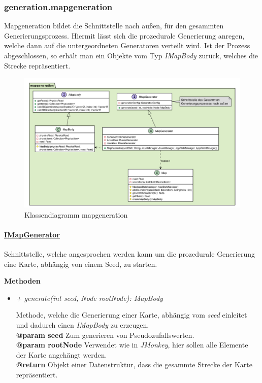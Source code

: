 \subsubsection{generation.mapgeneration}
    Mapgeneration bildet die Schnittstelle nach außen, für den gesammten Generierungsprozess. Hiermit lässt sich 
    die prozedurale Generierung anregen, welche dann auf die untergeordneten Generatoren verteilt wird. Ist der 
    Prozess abgeschlossen, so erhält man ein Objekte vom Typ \textit{IMapBody} zurück, welches die Strecke repräsentiert.

    \begin{figure}[htbp]
        \centering
        \includegraphics[width=\linewidth]{./Generierung/Bilder/mapgeneration.png}
        \caption{Klassendiagramm mapgeneration}
    \end{figure}


    \paragraph{\underline{IMapGenerator}} \mbox{}\par
            Schnittstelle, welche angesprochen werden kann um die prozedurale Generierung eine Karte, abhängig von 
            einem Seed, zu starten.\par
            
            \textbf{Methoden}					
            \begin{itemize}
                \item  \textit{+ generate(int seed, Node rootNode): MapBody}
                    \begin{leftbar}[0.9\linewidth]
                        Methode, welche die Generierung einer Karte, abhängig vom \textit{seed} einleitet
                         und dadurch einen \textit{IMapBody} zu erzeugen.\\
                        \textbf{@param seed} Zum generieren von Pseudozufallswerten.\\
                        \textbf{@param rootNode} Verwendet wie in \textit{JMonkey}, hier sollen alle Elemente der Karte 
                        angehängt werden.\\
                        \textbf{@return} Objekt einer Datenstruktur, dass die gesammte Strecke der Karte repräsentiert.
                    \end{leftbar} 
            \end{itemize}
    
